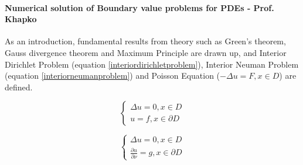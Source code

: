 \documentclass{article}
\begin{document}
\paragraph{Numerical solution of Boundary value problems for PDEs - Prof. Khapko}

As an introduction, fundamental results from theory such as Green's theorem, Gauss divergence theorem and Maximum Principle are drawn up, and Interior Dirichlet Problem (equation \ref{interiordirichletproblem}), Interior Neuman Problem (equation \ref{interiorneumanproblem}) and Poisson Equation ($-\Delta u = F, x \in D$) are defined.

\begin{equation}\label{interiordirichletproblem}
   \begin{cases}
               \Delta u = 0, x \in D\\
               u = f, x \in \partial D
   \end{cases}
\end{equation}

\begin{equation}\label{interiorneumanproblem}
   \begin{cases}
               \Delta u = 0, x \in D\\
               \frac{\partial u}{\partial \nu} = g, x \in \partial D
   \end{cases}
\end{equation}
\end{document}
